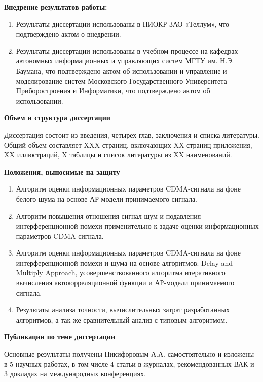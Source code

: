 {\bf{Внедрение результатов работы:}}
\begin{enumerate}
	\item Результаты диссертации использованы в НИОКР ЗАО «Теллум», что подтверждено актом о внедрении.
	\item Результаты диссертации использованы в учебном процессе на кафедрах автономных информационных и управляющих систем МГТУ им. Н.Э. Баумана,
		что подтверждено актом об использовании и управление и моделирование систем Московского Государственного Университета Приборостроения
		и Информатики, что подтверждено актом об использовании.
\end{enumerate}

{\bf{Объем и структура диссертации}}

Диссертация состоит из введения, четырех глав, заключения и списка литературы. Общий объем составляет XXX страниц, включающих XX страниц приложения, XX иллюстраций,
X таблицы и список литературы из XX наименований.

{\bf{Положения, выносимые на защиту}}
\begin{enumerate}
	\item {Алгоритм оценки информационных параметров CDMA-сигнала на фоне белого шума на основе АР-модели принимаемого сигнала.}
	\item {Алгоритм повышения отношения сигнал шум и подавления интерференционной помехи применительно к задаче оценки информационных параметров CDMA-сигнала.}
	\item {Алгоритм оценки информационных параметров CDMA-сигнала на фоне интерференционной помехи и шума на основе алгоритмов: Delay and Multiply Approach,
		усовершенствованного алгоритма итеративного вычисления автокорреляционной функции и АР-модели принимаемого сигнала.}
	\item {Результаты анализа точности, вычислительных затрат разработанных алгоритмов, а так же сравнительный анализ с типовым алгоритмом.}
\end{enumerate}

{\bf{Публикации по теме диссертации}}

Основные результаты получены Никифоровым А.А. самостоятельно и изложены в 5 научных работах, в том числе 4 статьи в журналах, рекомендованных ВАК и
3 докладах на международных конференциях.


%


